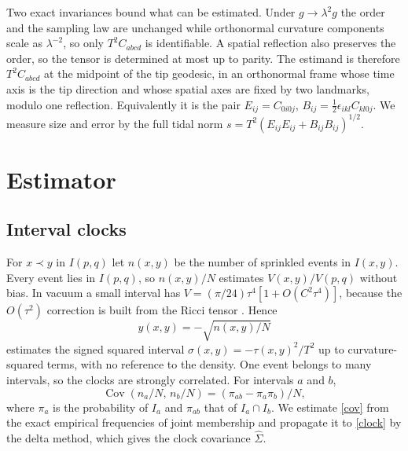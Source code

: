 \documentclass[11pt,a4paper]{article}
\begin{document}
Two exact invariances bound what can be estimated. Under
$g\to\lambda^2g$ the order and the sampling law are unchanged while
orthonormal curvature components scale as $\lambda^{-2}$, so only
$T^2C_{abcd}$ is identifiable. A spatial reflection also preserves the
order, so the tensor is determined at most up to parity. The estimand is
therefore $T^2C_{abcd}$ at the midpoint of the tip geodesic, in an
orthonormal frame whose time axis is the tip direction and whose spatial
axes are fixed by two landmarks, modulo one reflection. Equivalently it is
the pair $E_{ij}=C_{0i0j}$, $B_{ij}=\tfrac12\epsilon_{ikl}C_{kl0j}$. We
measure size and error by the full tidal norm
$s=T^2(E_{ij}E_{ij}+B_{ij}B_{ij})^{1/2}$.

\section{Estimator}\label{estimator}
\subsection{Interval clocks}
For $x\prec y$ in $I(p,q)$ let $n(x,y)$ be the number of sprinkled events in
$I(x,y)$. Every event lies in $I(p,q)$, so $n(x,y)/N$ estimates
$V(x,y)/V(p,q)$ without bias. In vacuum a small interval has
$V=(\pi/24)\tau^4[1+O(C^2\tau^4)]$, because the $O(\tau^2)$ correction is
built from the Ricci tensor \cite{gibbons,roy,wang}. Hence
\begin{equation}
 y(x,y)=-\sqrt{n(x,y)/N} \label{clock}
\end{equation}
estimates the signed squared interval $\sigma(x,y)=-\tau(x,y)^2/T^2$ up to
curvature-squared terms, with no reference to the density. One event belongs
to many intervals, so the clocks are strongly correlated. For intervals $a$
and $b$,
\begin{equation}
 \operatorname{Cov}\!\left(n_a/N,\,n_b/N\right)=(\pi_{ab}-\pi_a\pi_b)/N,
 \label{cov}
\end{equation}
where $\pi_a$ is the probability of $I_a$ and $\pi_{ab}$ that of
$I_a\cap I_b$. We estimate \eqref{cov} from the exact empirical frequencies
of joint membership and propagate it to \eqref{clock} by the delta method,
which gives the clock covariance $\widehat\Sigma$.
\end{document}
